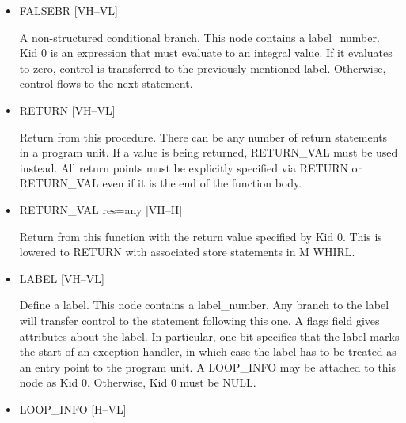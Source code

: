 \begin{itemize}
%
\item  FALSEBR \hfill [VH--VL]

A non-structured conditional branch. This node contains a
label\_number. Kid 0 is an expression that must evaluate to an integral
value. If it evaluates to zero, control is transferred to the
previously mentioned label. Otherwise, control flows to the next
statement.

\item
{}%
RETURN \hfill [VH--VL]

Return from this procedure. There can be any number of return
statements in a program unit. If a value is being returned,
%
RETURN\_VAL must be used instead. All return points must be explicitly
specified via
%
RETURN or
%
RETURN\_VAL even if it is the end of the function body.


\item
{}%
RETURN\_VAL res=any \hfill [VH--H]

Return from this function with the return value specified by Kid
0. This is lowered to
%
RETURN with associated store statements in M WHIRL.

%
\item  LABEL \hfill [VH--VL]

Define a label. This node contains a label\_number. Any branch to
the label will transfer control to the statement following this
one. A flags field
gives attributes about the label. In particular, one bit specifies
that the label marks the start of an exception handler, in which
case the label has to be treated as an entry point to the program
unit. A LOOP\_INFO may be attached to this node as Kid 0. Otherwise,
Kid 0 must be NULL.

%
\item  LOOP\_INFO \hfill \hfill [H--VL]


\end{itemize}
